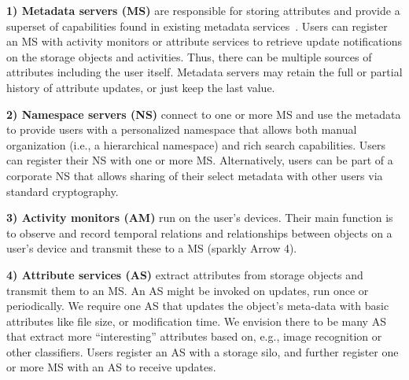 \noindent\textbf{1) Metadata servers (MS)}
are responsible for storing attributes and provide a superset of capabilities found in existing metadata services~\cite{federatedMetaData,smartstore}. Users can register an MS with activity monitors or attribute services to retrieve update notifications on the storage objects and activities. Thus, there can be multiple sources of attributes including the user itself. Metadata servers may retain the full or partial history of attribute updates, or just keep the last value. 


\noindent\textbf{2) Namespace servers (NS)}
connect to one or more MS and use the metadata to provide users with a personalized namespace that allows both manual organization (i.e., a hierarchical namespace) and rich search capabilities. 
Users can register their NS with one or more MS. Alternatively, users can be part of a corporate NS that allows sharing of their select metadata with other users via standard cryptography. 

\noindent\textbf{3) Activity monitors (AM)}
run on the user's devices. Their main function is to observe and record temporal relations and relationships between objects on a user's device and transmit these to a MS (sparkly Arrow 4).

\noindent\textbf{4) Attribute services (AS)}
extract attributes from storage objects and transmit them to an MS. An AS might be invoked on updates, run once or periodically. We require one AS that updates the object's meta-data with basic attributes like file size, or modification time. We envision there to be many AS that extract more ``interesting'' attributes based on, e.g., image recognition or other classifiers. Users register an AS with a storage silo, and further register one or more MS with an AS to receive updates.


